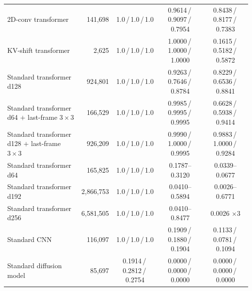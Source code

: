\documentclass[11pt]{article}
\begin{document}
\begin{table}[t]
{\begin{tabular}{lrccc}
\midrule
2D-conv transformer & 141,698 & 1.0\,/\,1.0\,/\,1.0 & 0.9614\,/\,0.9097\,/\,0.7954 & 0.8438\,/\,0.8177\,/\,0.7383 \\
KV-shift transformer & 2,625 & 1.0\,/\,1.0\,/\,1.0 & 1.0000\,/\,1.0000\,/\,1.0000 & 0.1615\,/\,0.5182\,/\,0.5872 \\
\midrule
Standard transformer d128 & 924,801 & 1.0\,/\,1.0\,/\,1.0 & 0.9263\,/\,0.7646\,/\,0.8784 & 0.8229\,/\,0.6536\,/\,0.8841 \\
Standard transformer d64 $+$ last-frame $3{\times}3$ & 166,529 & 1.0\,/\,1.0\,/\,1.0 & 0.9985\,/\,0.9995\,/\,0.9995 & 0.6628\,/\,0.5938\,/\,0.9414 \\
Standard transformer d128 $+$ last-frame $3{\times}3$ & 926,209 & 1.0\,/\,1.0\,/\,1.0 & 0.9990\,/\,1.0000\,/\,0.9995 & 0.9883\,/\,1.0000\,/\,0.9284 \\
Standard transformer d64 & 165,825 & 1.0\,/\,1.0\,/\,1.0 & 0.1787--0.3120 & 0.0339--0.0677 \\
Standard transformer d192 & 2,866,753 & 1.0\,/\,1.0\,/\,1.0 & 0.0410--0.5894 & 0.0026--0.6771 \\
Standard transformer d256 & 6,581,505 & 1.0\,/\,1.0\,/\,1.0 & 0.0410--0.8477 & 0.0026 $\times$3 \\
Standard CNN & 116,097 & 1.0\,/\,1.0\,/\,1.0 & 0.1909\,/\,0.1880\,/\,0.1904 & 0.1133\,/\,0.0781\,/\,0.1094 \\
Standard diffusion model & 85,697 & 0.1914\,/\,0.2812\,/\,0.2754 & 0.0000\,/\,0.0000\,/\,0.0000 & 0.0000\,/\,0.0000\,/\,0.0000 \\
\bottomrule
\end{tabular}}
\end{table}
\end{document}
